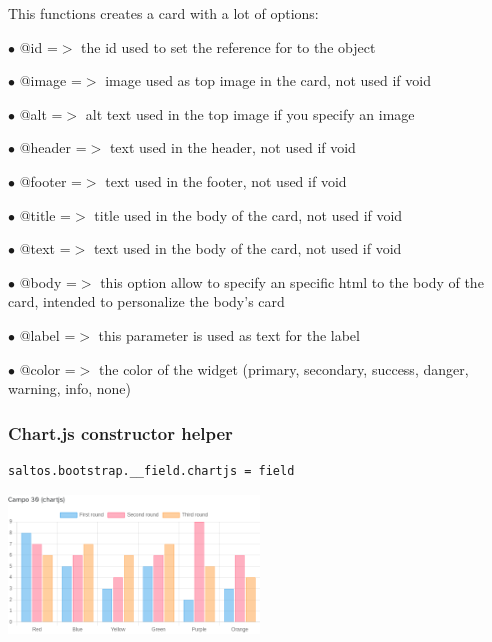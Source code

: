 \documentclass[a4paper]{article}
\begin{document}
This functions creates a card with a lot of options:

\begin{compactitem}
\item[\color{myblue}$\bullet$] @id     =$>$ the id used to set the reference for to the object
\item[\color{myblue}$\bullet$] @image  =$>$ image used as top image in the card, not used if void
\item[\color{myblue}$\bullet$] @alt    =$>$ alt text used in the top image if you specify an image
\item[\color{myblue}$\bullet$] @header =$>$ text used in the header, not used if void
\item[\color{myblue}$\bullet$] @footer =$>$ text used in the footer, not used if void
\item[\color{myblue}$\bullet$] @title  =$>$ title used in the body of the card, not used if void
\item[\color{myblue}$\bullet$] @text   =$>$ text used in the body of the card, not used if void
\item[\color{myblue}$\bullet$] @body   =$>$ this option allow to specify an specific html to the body of the card, intended
           to personalize the body's card
\item[\color{myblue}$\bullet$] @label  =$>$ this parameter is used as text for the label
\item[\color{myblue}$\bullet$] @color  =$>$ the color of the widget (primary, secondary, success, danger, warning, info, none)
\end{compactitem}

\hypertarget{toc78}{}
\subsubsection{Chart.js constructor helper}

\begin{lstlisting}
saltos.bootstrap.__field.chartjs = field
\end{lstlisting}

\begin{center}\includegraphics[width=0.5\textwidth]{../ujest/snaps/test-bootstrap-js-bootstrap-campo-30-chartjs-1-snap.png}\end{center}
\end{document}
